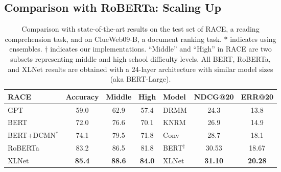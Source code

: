 \subsection{Comparison with RoBERTa: Scaling Up}
\label{sec:scale_up}

\begin{table}[!h]
	\small
	\centering
	\begin{tabular}{lccc|lcc}
		\toprule
		\bf RACE & \bf Accuracy & \bf Middle & \bf High & \bf Model & \bf NDCG@20 & \bf ERR@20 \\
		\midrule
		GPT \cite{radford2018improving} & 59.0 & 62.9 & 57.4 & DRMM \cite{guo2016deep} & 24.3 & 13.8 \\
		BERT \cite{pan2019improving} & 72.0 & 76.6 & 70.1 & KNRM \cite{dai2018convolutional} & 26.9 & 14.9 \\
		BERT+DCMN$^*$ \cite{zhang2019dual} & 74.1 & 79.5 & 71.8 & Conv \cite{dai2018convolutional} & 28.7 & 18.1 \\
		RoBERTa \cite{liu2019roberta} & 83.2 & 86.5 & 81.8 & BERT$^\dagger$ & 30.53 & 18.67 \\
		\midrule
		XLNet & \bf 85.4 & \bf 88.6 & \bf 84.0 & XLNet & \bf 31.10 & \bf 20.28 \\
		\bottomrule
	\end{tabular}
	\caption{\small
		Comparison with state-of-the-art results on the test set of RACE, a reading comprehension task, and on ClueWeb09-B, a document ranking task. $*$ indicates using ensembles. $\dagger$ indicates our implementations. ``Middle'' and ``High'' in RACE are two subsets representing middle and high school difficulty levels. All BERT, RoBERTa, and XLNet results are obtained with a 24-layer architecture with similar model sizes (aka BERT-Large).
	}
	\label{tab:race}
\end{table}

